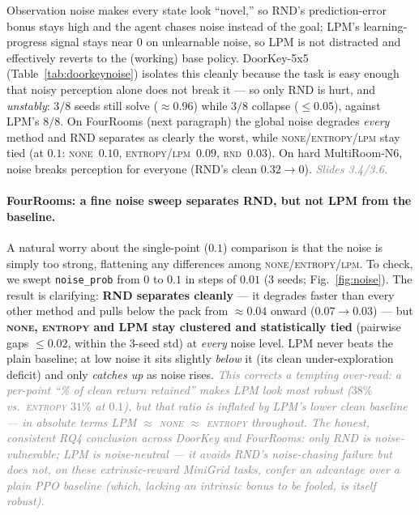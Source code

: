 \documentclass[11pt]{article}
\newcommand{\note}[1]{\textcolor{gray}{\small\emph{#1}}}
\begin{document}
Observation noise makes every state look ``novel,'' so RND's prediction-error bonus stays high and the
agent chases noise instead of the goal; LPM's learning-progress signal stays near $0$ on unlearnable
noise, so LPM is not distracted and effectively reverts to the (working) base policy. DoorKey-5x5
(Table~\ref{tab:doorkeynoise}) isolates this cleanly because the task is easy enough that noisy
perception alone does not break it --- so only RND is hurt, and \emph{unstably}: $3/8$ seeds still solve
($\approx0.96$) while $3/8$ collapse ($\le0.05$), against LPM's $8/8$. On FourRooms (next paragraph)
the global noise degrades \emph{every} method and RND separates as clearly the worst, while
\textsc{none}/\textsc{entropy}/\textsc{lpm} stay tied (at $0.1$: \textsc{none}~$0.10$,
\textsc{entropy}/\textsc{lpm}~$0.09$, \textsc{rnd}~$0.03$). On hard MultiRoom-N6, noise breaks
perception for everyone (RND's clean $0.32 \to 0$).
\note{Slides 3.4/3.6.}

\paragraph{FourRooms: a fine noise sweep separates RND, but not LPM from the baseline.} A natural worry
about the single-point ($0.1$) comparison is that the noise is simply too strong, flattening any
differences among \textsc{none}/\textsc{entropy}/\textsc{lpm}. To check, we swept \texttt{noise\_prob}
from $0$ to $0.1$ in steps of $0.01$ (3 seeds; Fig.~\ref{fig:noise}). The result is clarifying:
\textbf{RND separates cleanly} --- it degrades faster than every other method and pulls below the pack
from $\approx0.04$ onward ($0.07\!\to\!0.03$) --- but \textbf{\textsc{none}, \textsc{entropy} and LPM
stay clustered and statistically tied} (pairwise gaps $\le0.02$, within the 3-seed std) at \emph{every}
noise level. LPM never beats the plain baseline; at low noise it sits slightly \emph{below} it (its
clean under-exploration deficit) and only \emph{catches up} as noise rises. \note{This corrects a
tempting over-read: a per-point ``\% of clean return retained'' makes LPM look most robust ($38\%$ vs.\
\textsc{entropy} $31\%$ at $0.1$), but that ratio is inflated by LPM's \emph{lower clean baseline} ---
in absolute terms LPM $\approx$ \textsc{none} $\approx$ \textsc{entropy} throughout. The honest,
consistent RQ4 conclusion across DoorKey and FourRooms: \emph{only RND is noise-vulnerable; LPM is
noise-neutral} --- it avoids RND's noise-chasing failure but does not, on these extrinsic-reward
MiniGrid tasks, confer an advantage over a plain PPO baseline (which, lacking an intrinsic bonus to be
fooled, is itself robust).}
\end{document}
